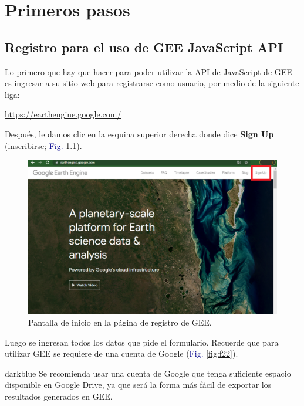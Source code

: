 \documentclass[
  12pt,
  letterpaper,
  twoside]{book}
\begin{document}
\newpage

\hypertarget{primeros-pasos}{%
\chapter{Primeros pasos}\label{primeros-pasos}}

\hypertarget{registro-para-el-uso-de-gee-javascript-api}{%
\section{Registro para el uso de GEE JavaScript API}\label{registro-para-el-uso-de-gee-javascript-api}}

Lo primero que hay que hacer para poder utilizar la API de JavaScript de GEE es ingresar a su sitio web para registrarse como usuario, por medio de la siguiente liga:

\url{https://earthengine.google.com/}

Después, le damos clic en la esquina superior derecha donde dice \textbf{Sign Up} (inscribirse; \textcolor{darkblue}{Fig.} \ref{fig:f21}).

\begin{figure}[H]

{\centering \includegraphics[width=0.8\linewidth]{Img/Signup} 

}

\caption{Pantalla de inicio en la página de registro de GEE.}\label{fig:f21}
\end{figure}

Luego se ingresan todos los datos que pide el formulario. Recuerde que para utilizar GEE se requiere de una cuenta de Google (\textcolor{darkblue}{Fig.} \ref{fig:f22}).

\begin{bluebox2}

\begin{awesomeblock}{5pt}{\faLightbulb}{darkblue}
Se recomienda usar una cuenta de Google que tenga suficiente espacio disponible en Google Drive, ya que será la forma más fácil de exportar los resultados generados en GEE.

\end{awesomeblock}

\end{bluebox2}
\end{document}
